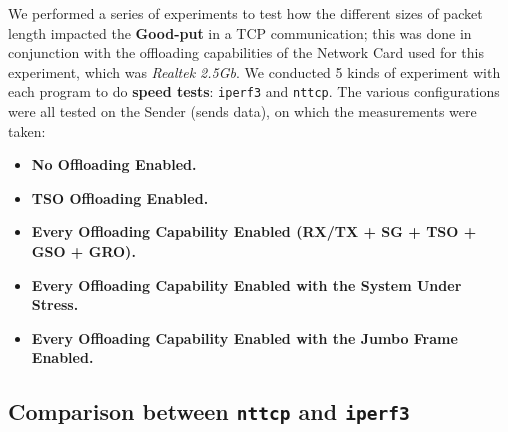 \documentclass{exam}
\begin{document}
We performed a series of experiments to test how the different sizes of packet length impacted the \textbf{Good-put} in a TCP communication; this was done in conjunction with the offloading capabilities of the Network Card used for this experiment, which was \textit{Realtek 2.5Gb}. We conducted 5 kinds of experiment with each program to do \textbf{speed tests}: \texttt{iperf3} and \texttt{nttcp}. The various configurations were all tested on the Sender (sends data), on which the measurements were taken:
\begin{itemize}
    \item \textbf{No Offloading Enabled.}
    \item \textbf{TSO Offloading Enabled.}
    \item \textbf{Every Offloading Capability Enabled (RX/TX + SG + TSO + GSO + GRO).}
    \item \textbf{Every Offloading Capability Enabled with the System Under Stress.}
    \item \textbf{Every Offloading Capability Enabled with the Jumbo Frame Enabled.}
\end{itemize}

\subsection{Comparison between \texttt{nttcp} and \texttt{iperf3}}
\end{document}

